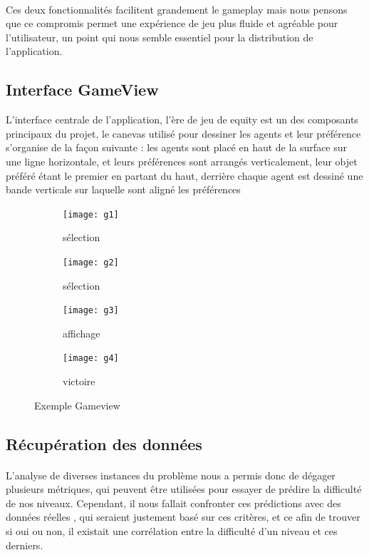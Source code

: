 \documentclass[../main.tex]{subfiles}
\begin{document}
\paragraph{}
    Ces deux fonctionnalités facilitent grandement le gameplay mais nous pensons que ce compromis permet une expérience de jeu plus fluide et agréable pour l’utilisateur, un point qui nous semble essentiel pour la distribution de l’application. 


	\subsection{Interface GameView}
	
L'interface centrale de  l'application, l'ère de jeu de equity est un des composants principaux du projet, le canevas utilisé pour dessiner les agents et leur préférence s'organise de la façon suivante : les agents sont placé en haut de la surface sur une ligne horizontale, et leurs préférences sont arrangés verticalement, leur objet préféré étant le premier en partant du haut, derrière chaque agent est dessiné une bande verticale sur laquelle sont aligné les préférences 
\begin{figure}[h!]
    \centering
    \begin{subfigure}{0.23\textwidth}
        \centering
        \texttt{[image: g1]}
        \caption{sélection}
    \end{subfigure}
        \begin{subfigure}{0.23\textwidth}
        \centering
        \texttt{[image: g2]}
        \caption{sélection}
    \end{subfigure}%
        \begin{subfigure}{0.23\textwidth}
        \centering
        \texttt{[image: g3]}
        \caption{affichage}
    \end{subfigure}%
    \begin{subfigure}{0.23\textwidth}
        \centering
        \texttt{[image: g4]}
        \caption{victoire}
    \end{subfigure}
    \caption{Exemple Gameview}
\end{figure}

	\subsection{Récupération des données}
	
	\paragraph{}
	L’analyse de diverses instances du problème nous a permis donc de dégager plusieurs métriques, qui peuvent être utilisées pour essayer de prédire la difficulté de nos niveaux. Cependant, il nous fallait confronter ces prédictions avec des données réelles , qui seraient justement basé sur ces critères, et ce afin de trouver si oui ou non, il existait une corrélation entre la difficulté d’un niveau et ces derniers. 
\end{document}
